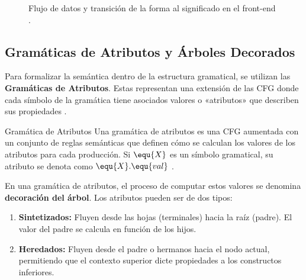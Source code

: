 \begin{figure}[htbp]
    \centering
    \caption{Flujo de datos y transición de la forma al significado en el front-end \cite{aho2006compilers}.}
    \label{fig:3_7_data_flow}
\end{figure}

\subsection{Gramáticas de Atributos y Árboles Decorados}
\label{subsec:3_7_2_gramaticas_atributos}

Para formalizar la semántica dentro de la estructura gramatical, se utilizan las \textbf{Gramáticas de Atributos}. Estas representan una extensión de las CFG donde cada símbolo de la gramática tiene asociados valores o «atributos» que describen sus propiedades \cite{aho2006compilers}.

\begin{definicion}{Gramática de Atributos}
Una gramática de atributos es una CFG aumentada con un conjunto de reglas semánticas que definen cómo se calculan los valores de los atributos para cada producción. Si $\equ{X}$ es un símbolo gramatical, su atributo se denota como $\equ{X}.\equ{val}$ \cite{aho2006compilers}.
\end{definicion}

En una gramática de atributos, el proceso de computar estos valores se denomina \textbf{decoración del árbol}. Los atributos pueden ser de dos tipos:
\begin{enumerate}
    \item \textbf{Sintetizados:} Fluyen desde las hojas (terminales) hacia la raíz (padre). El valor del padre se calcula en función de los hijos.
    \item \textbf{Heredados:} Fluyen desde el padre o hermanos hacia el nodo actual, permitiendo que el contexto superior dicte propiedades a los constructos inferiores.
\end{enumerate}

